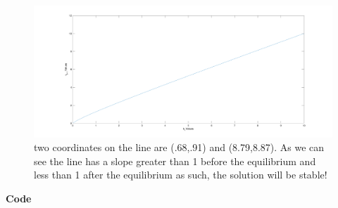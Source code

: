 \documentclass[12pt,oneside,reqno]{amsart}
\begin{document}
\begin{enumerate}
\begin{enumerate}
\begin{figure}[H]
        \centering
        \includegraphics[width =.8\linewidth]{HW1/pics/HW1_Q4.png}
        \caption{two coordinates on the line are (.68,.91) and (8.79,8.87). As we can see the line has a slope greater than 1 before the equilibrium and less than 1 after the equilibrium as such, the solution will be stable!}
    \end{figure}
\end{enumerate}

\end{enumerate}
{\bf Code}


\end{document}

